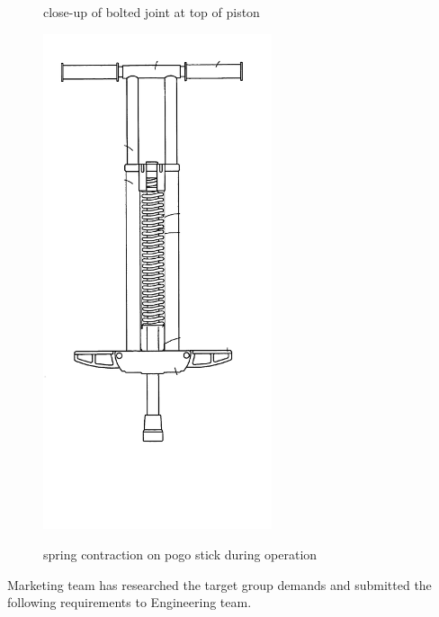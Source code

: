 \documentclass[
10pt,
a4paper,
openany,
svgnames,
]{book}
\begin{document}
\begin{exercises}
\begin{figure}[H]
\begin{minipage}[b]{0.4\textwidth}
      \caption{close-up of bolted joint at top of piston}
      \label{fig2}
      \includegraphics[width=0.6\textwidth]{pictures/Machine-interaction/pogostick-compress}
      \caption{spring contraction on pogo stick during operation}
      \label{fig4}
    \end{minipage}
  \end{figure}
  
  Marketing team has researched the target group demands and
  submitted the following requirements to Engineering team.
  

\end{exercises}
\end{document}
